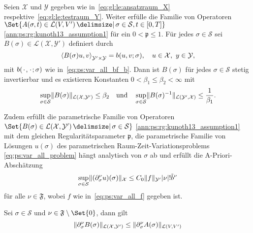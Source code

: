 \begin{Satz}
\label{satz:ps:rg:kunoth13_theorem21}
    Seien $\mathcal X$ und $\mathcal Y$ gegeben wie in~\cref{eq:gl:le:ansatzraum_X} respektive~\cref{eq:gl:le:testraum_Y}.
    Weiter erfülle die Familie von Operatoren $\Set{ A(\sigma, t) \in \mathcal L(V, V') \given \sigma \in \mathcal S, t \in [0, T] }$ \cref{ann:ps:rg:kunoth13_assumption1} für ein $0 < \mathfrak p \leq 1$.
    Für jedes $\sigma \in \mathcal S$ sei $B(\sigma) \in \mathcal L(\mathcal X, \mathcal Y')$ definiert durch
    \begin{equation}
        \label{eq:ps:rg:theorem21_variationsproblem_als_operatorgleichung_parametrisch}
        \left\langle B(\sigma) u,v\right\rangle_{\mathcal Y' \times \mathcal Y} = b(u, v; \sigma), \quad u \in \mathcal X,~y \in \mathcal Y,
    \end{equation}
    mit $b({\mkern2mu\cdot\mkern2mu}, {\mkern2mu\cdot\mkern2mu}; \sigma)$ wie in~\cref{eq:ps:var_all_bf_b}.
    Dann ist $B(\sigma)$ für jedes $\sigma \in \mathcal S$ stetig invertierbar und es existieren Konstanten $0 < \beta_{1} \leq \beta_{2} < \infty$ mit
    \begin{equation}
        \label{eq:ps:rg:theorem21_abschaetzungen_normen_B_und_B_inv_parametrisch}
        \sup_{\sigma \in \mathcal S} \lVert B(\sigma)\rVert_{\mathcal L(\mathcal X, \mathcal Y')} \leq \beta_{2} \quad \text{und} \quad  \sup_{\sigma \in \mathcal S} \lVert B(\sigma)^{-1}\rVert_{\mathcal L(\mathcal Y', \mathcal X)} \leq \frac{1}{\beta_{1}}.
    \end{equation}

    Zudem erfüllt die parametrische Familie von Operatoren $\Set{ B(\sigma) \in \mathcal L(\mathcal X, \mathcal Y') \given \sigma \in \mathcal S }$ \cref{ann:ps:rg:kunoth13_assumption1} mit dem gleichen Regularitätsparameter $\mathfrak p$, die parametrische Familie von Lösungen $u(\sigma)$ des parametrischen Raum-Zeit-Variationsproblems \cref{eq:ps:var_all_problem} hängt analytisch von $\sigma$ ab und erfüllt die A-Priori-Abschätzung
    \begin{equation}
        \label{eq:ps:rg:theorem21_apriori_schranke}
        \sup_{\sigma \in \mathcal S} \lVert(\partial^{\nu}_{\sigma} u)(\sigma)\rVert_{\mathcal X} \leq C_{0} \lVert f\rVert_{\mathcal Y'} \lvert\nu\rvert! \tilde{b}^{\nu}
    \end{equation}
    für alle $\nu \in \mathfrak F$, wobei $f$ wie in~\cref{eq:ps:var_all_f} gegeben ist.
\end{Satz}

\begin{Lemma}
\label{lem:ps:rg:norm_B_beschraenkt_durch_norm_A}
    Sei $\sigma \in \mathcal S$ und $\nu \in \mathfrak F \setminus \Set{ 0 }$, dann gilt
    \begin{equation}
        \lVert\partial^{\nu}_{\sigma} B(\sigma)\rVert_{\mathcal L(\mathcal X, \mathcal Y')}
        \leq
        \lVert\partial^{\nu}_{\sigma} A(\sigma)\rVert_{\mathcal L(V, V')}
    \end{equation}

    \begin{Beweis}
    \end{Beweis}
\end{Lemma}

